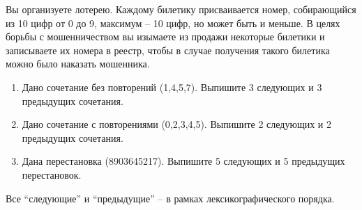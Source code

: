 \question
Вы организуете лотерею. Каждому билетику присваивается номер, собирающийся из 10 цифр от 0 до 9, максимум – 10 цифр, но может быть и меньше. В целях борьбы с мошенничеством вы изымаете из продажи некоторые билетики и записываете их номера в реестр, чтобы в случае получения такого билетика можно было наказать мошенника.

\begin{enumerate}
\item Дано сочетание без повторений (1,4,5,7). Выпишите 3 следующих и 3 предыдущих сочетания.
	\item Дано сочетание с повторениями (0,2,3,4,5). Выпишите 2 следующих и 2 предыдущих сочетания.
	\item Дана перестановка (8903645217). Выпишите 5 следующих и 5 предыдущих перестановок.
\end{enumerate}

Все “следующие” и “предыдущие” – в рамках лексикографического порядка.

